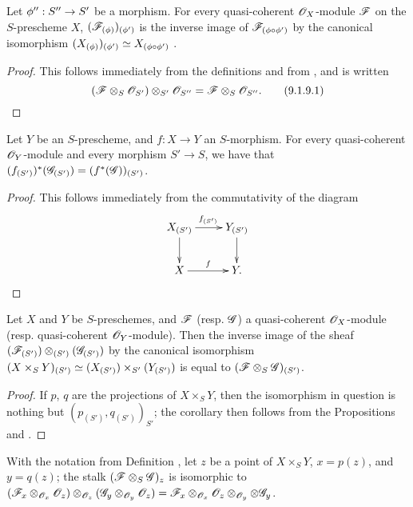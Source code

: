 \begin{prop}[9.1.9]
\label{1.9.1.9}
Let $\vphi'':S''\to S'$ be a morphism.
For every quasi-coherent $\mathscr{O}_X$-module $\mathscr{F}$ on the $S$-prescheme $X$,
$(\mathscr{F}_{(\phi)})_{(\phi')}$ is the inverse image of
$\mathscr{F}_{(\phi\circ\phi')}$ by the canonical isomorphism
$(X_{(\phi)})_{(\phi')}\simeq X_{(\phi\circ\phi')}$
.
\end{prop}

\begin{proof}
\label{proof-1.9.1.9}
This follows immediately from the definitions and from , and is
written
\[
  (\mathscr{F}\otimes_S\mathscr{O}_{S'})\otimes_{S'}\mathscr{O}_{S''}=\mathscr{F}\otimes_S\mathscr{O}_{S''}.
  \tag{9.1.9.1}
\]
\end{proof}

\begin{prop}[9.1.10]
\label{1.9.1.10}
Let $Y$ be an $S$-prescheme, and $f:X\to Y$ an $S$-morphism.
For every quasi-coherent $\mathscr{O}_Y$-module and every morphism
$S'\to S$, we have that
$(f_{(S')})^*(\mathscr{G}_{(S')})=(f^*(\mathscr{G}))_{(S')}$.
\end{prop}

\begin{proof}
\label{proof-1.9.1.10}
This follows immediately from the commutativity of the diagram
\[
  \xymatrix{
    X_{(S')}\ar[r]^{f_{(S')}}\ar[d] &
    Y_{(S')}\ar[d]\\
    X\ar[r]^f &
    Y.
  }
\]
\end{proof}

\begin{cor}[9.1.11]
\label{1.9.1.11}
Let $X$ and $Y$ be $S$-preschemes, and
$\mathscr{F}$ (resp. $\mathscr{G}$) a quasi-coherent $\mathscr{O}_X$-module
(resp. quasi-coherent $\mathscr{O}_Y$-module). Then the inverse image of the sheaf
$(\mathscr{F}_{(S')})\otimes_{(S')}(\mathscr{G}_{(S')})$ by the canonical isomorphism
$(X\times_S Y)_{(S')}\simeq(X_{(S')})\times_{S'}(Y_{(S')})$
 is equal to $(\mathscr{F}\otimes_S\mathscr{G})_{(S')}$.
\end{cor}

\begin{proof}
\label{proof-1.9.1.11}
If $p$, $q$ are the projections of $X\times_S Y$, then the isomorphism in question
is nothing but $(p_{(S')}, q_{(S')})_{S'}$; the corollary then follows from the
Propositions  and .
\end{proof}

\begin{prop}[9.1.12]
\label{1.9.1.12}
With the notation from Definition , let $z$ be
a point of $X\times_S Y$, $x=p(z)$, and $y=q(z)$; the stalk
$(\mathscr{F}\otimes_S\mathscr{G})_z$ is isomorphic to
$(\mathscr{F}_x\otimes_{\mathscr{O}_x}\mathscr{O}_z)\otimes_{\mathscr{O}_z}(\mathscr{G}_y\otimes_{\mathscr{O}_y}\mathscr{O}_z)
  =\mathscr{F}_x\otimes_{\mathscr{O}_x}\mathscr{O}_z\otimes_{\mathscr{O}_y}\otimes\mathscr{G}_y$.
\end{prop}

